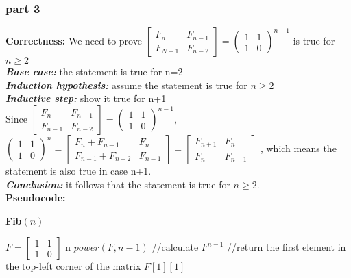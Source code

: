 \documentclass[twoside]{homework}
\begin{document}
\subsubsection*{part 3} 
\textbf{Correctness:} \quad
We need to prove $\begin{bmatrix}
F_n&F_{n-1}\\
F_{N-1}&F_{n-2}
\end{bmatrix}=\begin{pmatrix}
	1&1\\
	1&0
\end{pmatrix}^{n-1}$ is true for $n\ge 2$
\\\textbf{\emph{Base case:}} the statement is true for n=2
\\\textbf{\emph{Induction hypothesis:}} assume the statement is true for $n\ge 2$
\\\textbf{\emph{Inductive step:}} show it true for n+1
\\Since $\begin{bmatrix}
F_n&F_{n-1}\\
F_{n-1}&F_{n-2}
\end{bmatrix}=\begin{pmatrix}
1&1\\
1&0
\end{pmatrix}^{n-1}$, 
\\$\begin{pmatrix}
1&1\\
1&0
\end{pmatrix}^{n}=\begin{bmatrix}
	F_n+F_{n-1}&F_n\\
	F_{n-1}+F_{n-2}&F_{n-1}
\end{bmatrix}=\begin{bmatrix}
F_{n+1}&F_n\\
F_{n}&F_{n-1}
\end{bmatrix}$
, which means the statement is also true in case n+1.
\\\textbf{\emph{Conclusion:}} 
it follows that the statement is true for $n\ge 2$.
\\\textbf{Pseudocode:} \quad
\begin{algorithm}
	\caption*{\textbf{Fib}$(n)$}
	\begin{algorithmic}
		\STATE $F=\begin{bmatrix}
		1&1\\
		1&0
		\end{bmatrix}$
		\RETURN n
		\ENDIF
		\STATE $power(F,n-1)$ //calculate $F^{n-1}$
		\STATE //return the first element in the top-left corner of the matrix
		\RETURN $F[1][1]$		
	\end{algorithmic}		
\end{algorithm}
\end{document}
